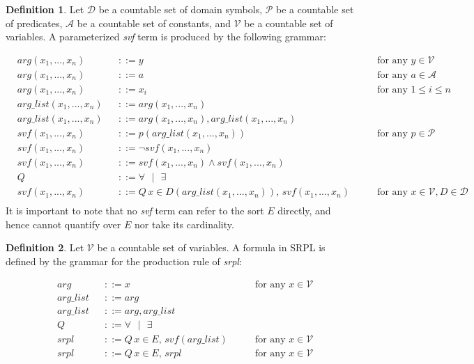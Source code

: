 \documentclass[12pt]{article}
\theoremstyle{definition}
\newtheorem{definition}{Definition}
\theoremstyle{remark}
\newcommand{\st}{\text{ }|\text{ }}
\begin{document}
\begin{definition}
  Let $\mathcal{D}$ be a countable set of domain symbols, $\mathcal{P}$ be a countable set of predicates, $\mathcal{A}$ be a countable set of constants, and $\mathcal{V}$ be a countable set of variables.  A parameterized \textit{svf} term is produced by the following grammar:

  \begin{align*}
    &arg(x_1,...,x_n)& &::= y \qquad &\text{for any } y \in \mathcal{V}\\
    &arg(x_1,...,x_n)& &::= a \qquad &\text{for any } a \in \mathcal{A}\\
    &arg(x_1,...,x_n)& &::= x_i \qquad &\text{for any } 1 \leq i \leq n\\
    &arg\_list(x_1,...,x_n)& &::= arg(x_1,...,x_n)\\
    &arg\_list(x_1,...,x_n)& &::= arg(x_1,...,x_n),arg\_list(x_1,...,x_n)\\
    &svf(x_1,...,x_n)& &::= p(arg\_list(x_1,...,x_n)) \qquad &\text{for any } p \in \mathcal{P}\\
    &svf(x_1,...,x_n)& &::= \neg svf(x_1,...,x_n)\\
    &svf(x_1,...,x_n)& &::= svf(x_1,...,x_n) \land svf(x_1,...,x_n)\\
    &Q& &::= \forall \st \exists\\
    &svf(x_1,...,x_n)& &::= Q \, x \in D(arg\_list(x_1,...,x_n)), \, svf(x_1,...,x_n) \qquad &\text{for any } x \in \mathcal{V}, D \in \mathcal{D}\\
  \end{align*}
  It is important to note that no \textit{svf} term can refer to the sort $E$ directly, and hence cannot quantify over $E$ nor take its cardinality.
\end{definition}

\begin{definition}
  Let $\mathcal{V}$ be a countable set of variables.  A formula in SRPL is defined by the grammar for the production rule of \textit{srpl}:

  \begin{align*}
    &arg& &::= x \qquad &\text{for any } x \in \mathcal{V}\\
    &arg\_list& &::= arg\\
    &arg\_list& &::= arg,arg\_list\\
    &Q& &::= \forall \st \exists\\
    &srpl& &::= Q \, x \in E, \, svf(arg\_list) \qquad &\text{for any } x \in \mathcal{V}\\
    &srpl& &::= Q \, x \in E, \, srpl \qquad &\text{for any } x \in \mathcal{V}\\
  \end{align*}
\end{definition}
\end{document}
